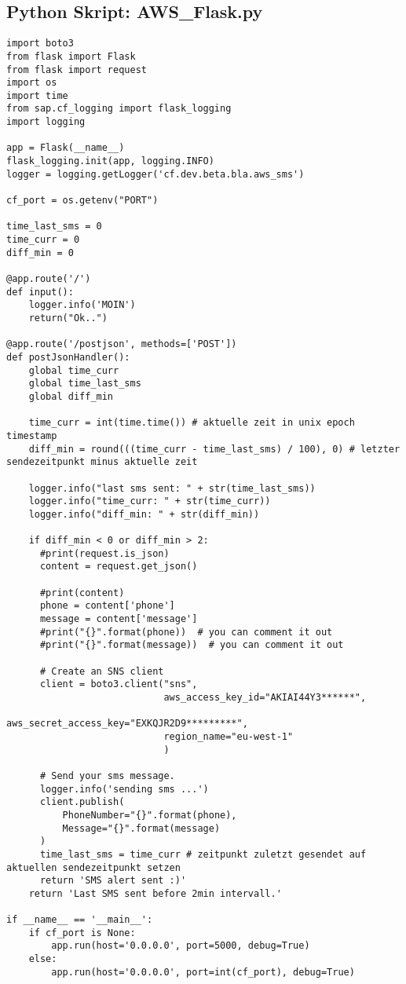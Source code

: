 \subsection{Python Skript: AWS\_Flask.py}
\begin{lstlisting}
import boto3
from flask import Flask
from flask import request
import os
import time
from sap.cf_logging import flask_logging
import logging

app = Flask(__name__)
flask_logging.init(app, logging.INFO)
logger = logging.getLogger('cf.dev.beta.bla.aws_sms')

cf_port = os.getenv("PORT")

time_last_sms = 0
time_curr = 0
diff_min = 0

@app.route('/')
def input():
    logger.info('MOIN')
    return("Ok..")

@app.route('/postjson', methods=['POST'])
def postJsonHandler():
    global time_curr
    global time_last_sms
    global diff_min

    time_curr = int(time.time()) # aktuelle zeit in unix epoch timestamp
    diff_min = round(((time_curr - time_last_sms) / 100), 0) # letzter sendezeitpunkt minus aktuelle zeit

    logger.info("last sms sent: " + str(time_last_sms))
    logger.info("time_curr: " + str(time_curr))
    logger.info("diff_min: " + str(diff_min))

    if diff_min < 0 or diff_min > 2:
      #print(request.is_json)
      content = request.get_json()

      #print(content)
      phone = content['phone']
      message = content['message']
      #print("{}".format(phone))  # you can comment it out
      #print("{}".format(message))  # you can comment it out

      # Create an SNS client
      client = boto3.client("sns",
                            aws_access_key_id="AKIAI44Y3******",
                            aws_secret_access_key="EXKQJR2D9*********",
                            region_name="eu-west-1"
                            )

      # Send your sms message.
      logger.info('sending sms ...')
      client.publish(
          PhoneNumber="{}".format(phone),
          Message="{}".format(message)
      )
      time_last_sms = time_curr # zeitpunkt zuletzt gesendet auf aktuellen sendezeitpunkt setzen
      return 'SMS alert sent :)'
    return 'Last SMS sent before 2min intervall.'

if __name__ == '__main__':
    if cf_port is None:
        app.run(host='0.0.0.0', port=5000, debug=True)
    else:
        app.run(host='0.0.0.0', port=int(cf_port), debug=True)
\end{lstlisting}

